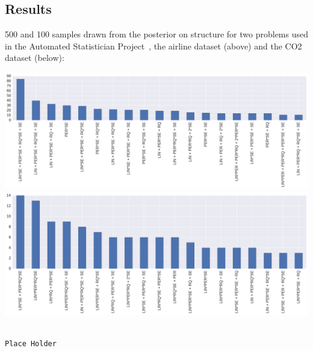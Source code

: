 \documentclass[a0,portrait]{a0poster}
\begin{document}
\begin{multicols}{3}
 \subsection*{Results}
 500 and 100 samples drawn from the posterior on structure for two problems used in the Automated Statistician Project~\cite{duvenaud2013structure}, the airline dataset (above) and the CO2 dataset (below):
 \begin{center}\vspace{1cm}
\includegraphics[width=0.7\linewidth]{structureCo2b.png}
\includegraphics[width=0.7\linewidth]{structureAirlinec.png}
\end{center}\vspace{1cm}
 \begin{minipage}{\linewidth}
\small
\begin{lstlisting}[frame=single,label=alg:structureVent,caption=Venture Code for Bayesian GP Structure Learning,mathescape]

Place Holder

\end{lstlisting}

\end{minipage}

\end{multicols}
\end{document}
